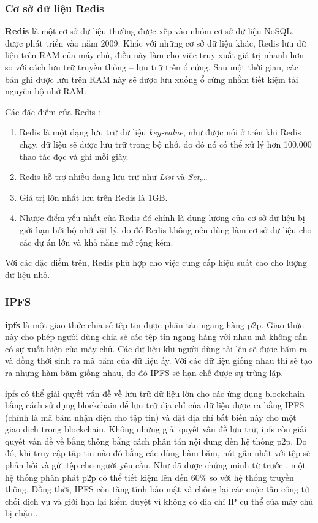 \documentclass[../main-report.tex]{subfiles}
\begin{document}
\subsubsection{Cơ sở dữ liệu Redis}
\textbf{Redis} là một cơ sở dữ liệu thường được xếp vào nhóm cơ sở dữ liệu NoSQL, được phát triển vào năm 2009. Khác với những cơ sở dữ liệu khác, Redis lưu dữ liệu trên RAM của máy chủ, điều này làm cho việc truy xuất giá trị nhanh hơn so với cách lưu trữ truyền thống – lưu trữ trên ổ cứng. Sau một thời gian, các bản ghi được lưu trên RAM này sẽ được lưu xuống ổ cứng nhằm tiết kiệm tài nguyên bộ nhớ RAM.

Các đặc điểm của Redis \cite{6106531}:

\begin{enumerate}[label=(\roman*)]
\item Redis là một dạng lưu trữ dữ liệu \textit{key-value}, như được nói ở trên khi Redis chạy, dữ liệu sẽ được lưu trữ trong bộ nhớ, do đó nó có thể xử lý hơn 100.000 thao tác đọc và ghi mỗi giây.
\item Redis hỗ trợ nhiều dạng lưu trữ như \textit{List} và \textit{Set},\ldots
\item Giá trị lớn nhất lưu trên Redis là 1GB.
\item Nhược điểm yếu nhất của Redis đó chính là dung lương của cơ sở dữ liệu bị giới hạn bởi bộ nhớ vật lý, do đó Redis không nên dùng làm cơ sở dữ liệu cho các dự án lớn và khả năng mở rộng kém.
\end{enumerate}

Với các đặc điểm trên, Redis phù hợp cho việc cung cấp hiệu suất cao cho lượng dữ liệu nhỏ.

\subsubsection{IPFS}
\textbf{\acrfull{ipfs}} là một giao thức chia sẻ tệp tin được phân tán ngang hàng \acrfull{p2p}. Giao thức này cho phép người dùng chia sẻ các tệp tin ngang hàng với nhau mà không cần có sự xuất hiện của máy chủ. Các dữ liệu khi người dùng tải lên sẽ được băm ra và đồng thời sinh ra mã băm của dữ liệu ấy. Với các dữ liệu giống nhau thì sẽ tạo ra những hàm băm giống nhau, do đó IPFS sẽ hạn chế được sự trùng lặp.
 
\acrshort{ipfs} có thể giải quyết vấn đề về lưu trữ dữ liệu lớn cho các ứng dụng \gls{blockchain} bằng cách sử dụng blockchain để lưu trữ địa chỉ của dữ liệu được ra bằng IPFS (chính là mã băm nhận diện cho tập tin) và đặt địa chỉ bất biến này cho một giao dịch trong blockchain. Không những giải quyết vấn đề lưu trữ, \acrshort{ipfs} còn giải quyết vấn đề về bằng thông bằng cách phân tán nội dung đến hệ thống \acrshort{p2p}. Do đó, khi truy cập tập tin nào đó bằng các dùng hàm băm, nút gần nhất với tệp sẽ phản hồi và gửi tệp cho người yêu cầu. Như đã được chứng minh từ trước \cite{5235364}, một hệ thống phân phát \acrshort{p2p} có thể tiết kiệm lên đến 60\% so với hệ thống truyền thống. Đồng thời, IPFS còn tăng tính bảo mật và chống lại các cuộc tấn công từ chối dịch vụ và giới hạn lại kiểm duyệt vì không có địa chỉ IP cụ thể của máy chủ bị chặn \cite{8441990}.
\end{document}
